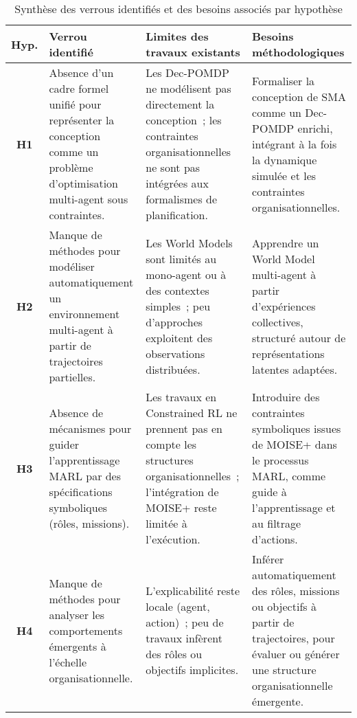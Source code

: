 \begin{table}[ht]
    \centering
    \caption{Synthèse des verrous identifiés et des besoins associés par hypothèse}
    \label{tab:verrous_hypotheses}
    \renewcommand{\arraystretch}{1.3}
    \begin{tabularx}{\textwidth}{cXXX}
    \hline
    \textbf{Hyp.} & \textbf{Verrou identifié} & \textbf{Limites des travaux existants} & \textbf{Besoins méthodologiques} \\
    \hline
    \textbf{H1} & Absence d'un cadre formel unifié pour représenter la conception comme un problème d'optimisation multi-agent sous contraintes. & Les Dec-POMDP ne modélisent pas directement la conception~; les contraintes organisationnelles ne sont pas intégrées aux formalismes de planification. & Formaliser la conception de SMA comme un Dec-POMDP enrichi, intégrant à la fois la dynamique simulée et les contraintes organisationnelles. \\

    \textbf{H2} & Manque de méthodes pour modéliser automatiquement un environnement multi-agent à partir de trajectoires partielles. & Les World Models sont limités au mono-agent ou à des contextes simples~; peu d'approches exploitent des observations distribuées. & Apprendre un World Model multi-agent à partir d'expériences collectives, structuré autour de représentations latentes adaptées. \\

    \textbf{H3} & Absence de mécanismes pour guider l'apprentissage MARL par des spécifications symboliques (rôles, missions). & Les travaux en Constrained RL ne prennent pas en compte les structures organisationnelles~; l'intégration de MOISE+ reste limitée à l'exécution. & Introduire des contraintes symboliques issues de MOISE+ dans le processus MARL, comme guide à l'apprentissage et au filtrage d'actions. \\

    \textbf{H4} & Manque de méthodes pour analyser les comportements émergents à l'échelle organisationnelle. & L'explicabilité reste locale (agent, action)~; peu de travaux infèrent des rôles ou objectifs implicites. & Inférer automatiquement des rôles, missions ou objectifs à partir de trajectoires, pour évaluer ou générer une structure organisationnelle émergente. \\
    \hline
    \end{tabularx}
    \end{table}
    